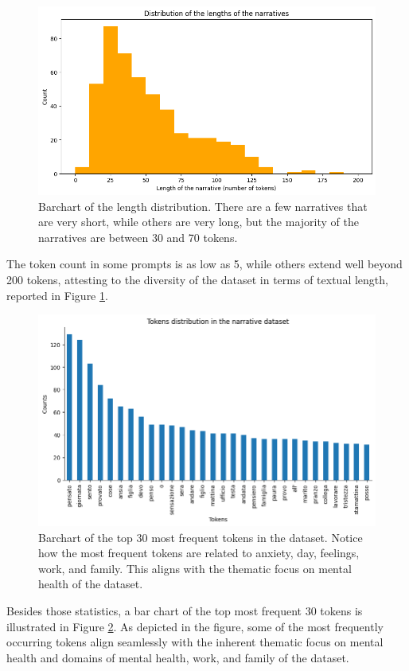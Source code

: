 \begin{figure}[!htbp]
    \centering
    \includegraphics[width=1\linewidth]{assets//imgs/dataset-length-distribution.png}
    \caption{Barchart of the length distribution. There are a few narratives that are very short, while others are very long, but the majority of the narratives are between 30 and 70 tokens.}
    \label{fig:dataset-length-distruibution}
\end{figure}
The token count in some prompts is as low as 5, while others extend well beyond 200 tokens, attesting to the diversity of the dataset in terms of textual length, reported in Figure \ref{fig:dataset-length-distruibution}. %

\begin{figure}[!htbp]
    \centering
    \includegraphics[width=1\linewidth]{assets//imgs/dataset-top-30-prompt.png}
    \caption{Barchart of the top 30 most frequent tokens in the dataset. Notice how the most frequent tokens are related to anxiety, day, feelings, work, and family. This aligns with the thematic focus on mental health of the dataset.}
    \label{fig:dataset-top-30-prompt}
\end{figure}

Besides those statistics, a bar chart of the top most frequent 30 tokens is illustrated in Figure \ref{fig:dataset-top-30-prompt}. As depicted in the figure, some of the most frequently occurring tokens align seamlessly with the inherent thematic focus on mental health and domains of mental health, work, and family of the dataset.

